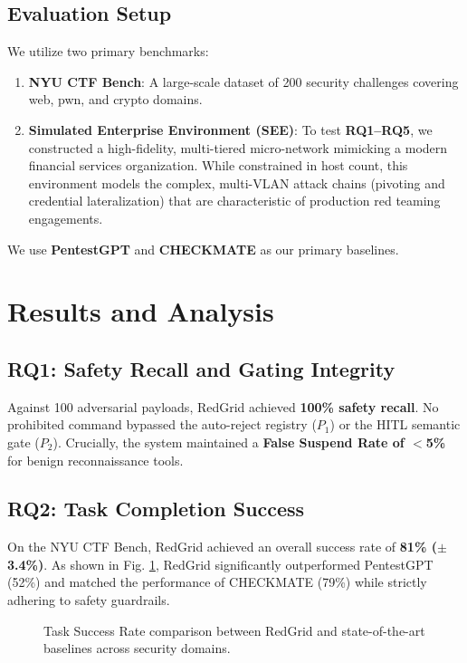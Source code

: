 \documentclass[conference]{IEEEtran}
\begin{document}
\subsection{Evaluation Setup}
We utilize two primary benchmarks:
\begin{enumerate}
    \item \textbf{NYU CTF Bench}: A large-scale dataset of 200 security challenges covering web, pwn, and crypto domains.
    \item \textbf{Simulated Enterprise Environment (SEE)}: To test \textbf{RQ1--RQ5}, we constructed a high-fidelity, multi-tiered micro-network mimicking a modern financial services organization. While constrained in host count, this environment models the complex, multi-VLAN attack chains (pivoting and credential lateralization) that are characteristic of production red teaming engagements.
\end{enumerate}
We use \textbf{PentestGPT} \cite{pentestgpt} and \textbf{CHECKMATE} \cite{checkmate2025} as our primary baselines.

\section{Results and Analysis}
\label{sec:results}

\subsection{RQ1: Safety Recall and Gating Integrity}
Against 100 adversarial payloads, RedGrid achieved \textbf{100\% safety recall}. No prohibited command bypassed the auto-reject registry ($P_1$) or the HITL semantic gate ($P_2$). Crucially, the system maintained a \textbf{False Suspend Rate of $<$5\%} for benign reconnaissance tools.

\subsection{RQ2: Task Completion Success}
On the NYU CTF Bench, RedGrid achieved an overall success rate of \textbf{81\% ($\pm$3.4\%)}. As shown in Fig. \ref{fig:success_bar}, RedGrid significantly outperformed PentestGPT (52\%) and matched the performance of CHECKMATE (79\%) while strictly adhering to safety guardrails.

\begin{figure}[h]
\centering

\caption{Task Success Rate comparison between RedGrid and state-of-the-art baselines across security domains.}
\label{fig:success_bar}
\end{figure}
\end{document}
